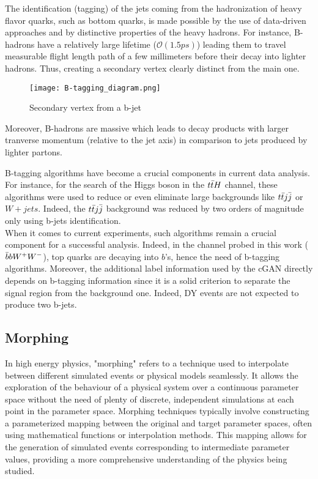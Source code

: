 The identification (tagging) of the jets coming from the hadronization of heavy flavor quarks, such as bottom quarks, is made possible by the use of data-driven approaches and by distinctive properties of the heavy hadrons. For instance, B-hadrons have a relatively large lifetime ($\mathcal{O}(1.5ps)$) leading them to travel measurable flight length path of a few millimeters before their decay into lighter hadrons. Thus, creating a secondary vertex clearly distinct from the main one.

\begin{figure}[H]
    \centering
    \texttt{[image: B-tagging\_diagram.png]}
    \caption{Secondary vertex from a b-jet}
    \label{fig:enter-label}
\end{figure}

Moreover, B-hadrons are massive which leads to decay products with larger tranverse momentum (relative to the jet axis) in comparison to jets produced by lighter partons.

B-tagging algorithms have become a crucial components in current data analysis. For instance, for the search of the Higgs boson in the $t\Bar{t}H$ channel, these algorithms were used to reduce or even eliminate large backgrounds like $t\Bar{t}j\Bar{j}$ or $W+jets$. Indeed, the $t\Bar{t}j\Bar{j}$ background was reduced by two orders of magnitude only using b-jets identification.\\
When it comes to current experiments, such algorithms remain a crucial component for a successful analysis. Indeed, in the channel probed in this work ($\Bar{b}bW^+W^-$), top quarks are decaying into $b$'s, hence the need of b-tagging algorithms. Moreover, the additional label information used by the cGAN directly depends on b-tagging information since it is a solid criterion to separate the signal region from the background one. Indeed, DY events are not expected to produce two b-jets.


\subsection{Morphing}

In high energy physics, "morphing" refers to a technique used to interpolate between different simulated events or physical models seamlessly. It allows the exploration of the behaviour of a physical system over a continuous parameter space without the need of plenty of discrete, independent simulations at each point in the parameter space. Morphing techniques typically involve constructing a parameterized mapping between the original and target parameter spaces, often using mathematical functions or interpolation methods. This mapping allows for the generation of simulated events corresponding to intermediate parameter values, providing a more comprehensive understanding of the physics being studied.\\

